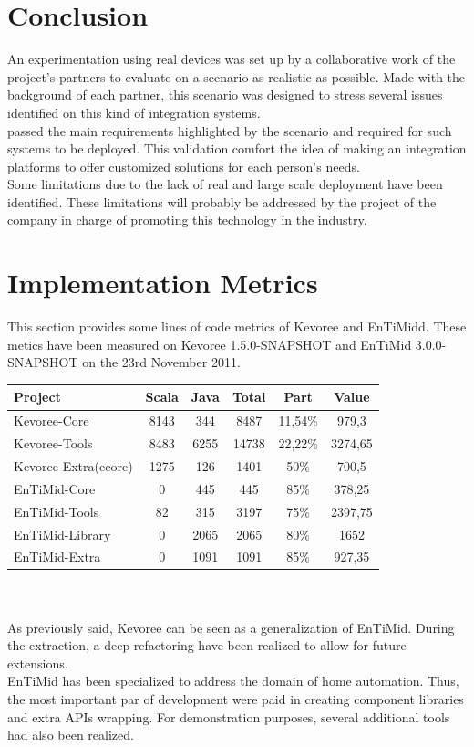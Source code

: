 

\section{Conclusion}
\label{sec:concluAAL}

An experimentation using real devices was set up by a collaborative work of the project's partners to evaluate \enti{} on a scenario as realistic as possible. Made with the background of each partner, this scenario was designed to stress several issues identified on this kind of integration systems.\\
\enti{} passed the main requirements highlighted by the scenario and required for such systems to be deployed. This validation comfort the idea of making \enti{} an integration platforms to offer customized solutions for each person's needs.\\
Some limitations due to the lack of real and large scale deployment have been identified. These limitations will probably be addressed by the project of the company in charge of promoting this technology in the industry.



\section{Implementation Metrics}

This section provides some lines of code metrics of Kevoree and EnTiMidd. These metics have been measured on Kevoree 1.5.0-SNAPSHOT and EnTiMid 3.0.0-SNAPSHOT on the 23rd November 2011.\\

\begin{tabular}{l||c|c|c|c|c}
Project & Scala & Java & Total & Part & Value \\
\hline \hline
Kevoree-Core & 8143 & 344 & 8487 & 11,54\% & 979,3 \\
Kevoree-Tools & 8483 & 6255 & 14738 & 22,22\% & 3274,65 \\
Kevoree-Extra(ecore) & 1275 & 126 & 1401 & 50\% & 700,5 \\
\hline \hline
EnTiMid-Core & 0 & 445 & 445 & 85\% & 378,25 \\
EnTiMid-Tools & 82 & 315 & 3197 & 75\% & 2397,75 \\
EnTiMid-Library & 0 & 2065 & 2065 & 80\% & 1652 \\
EnTiMid-Extra & 0 & 1091 & 1091 & 85\% & 927,35 \\
\end{tabular}\\
\\

As previously said, Kevoree can be seen as a generalization of EnTiMid. During the extraction, a deep refactoring have been realized to allow for future extensions.\\
EnTiMid has been specialized to address the domain of home automation. Thus, the most important par of development were paid in creating component libraries and extra APIs wrapping. For demonstration purposes, several additional tools had also been realized.

